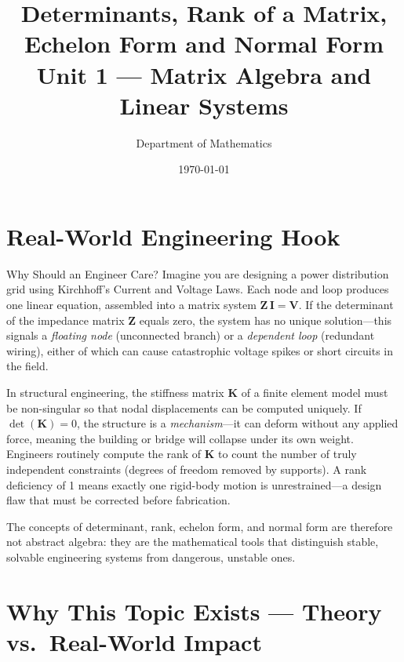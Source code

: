 \documentclass[12pt,a4paper]{article}
\title{\textbf{Determinants, Rank of a Matrix, Echelon Form and Normal Form} \\ \large Unit 1 --- Matrix Algebra and Linear Systems}
\author{Department of Mathematics}
\date{\today}
\begin{document}
\maketitle
\tableofcontents
\newpage

\section{Real-World Engineering Hook}

\begin{curiositybox}{Why Should an Engineer Care?}
Imagine you are designing a power distribution grid using Kirchhoff's Current and Voltage Laws.
Each node and loop produces one linear equation, assembled into a matrix system $\mathbf{Z}\,\mathbf{I} = \mathbf{V}$.
If the determinant of the impedance matrix $\mathbf{Z}$ equals zero, the system has no unique solution---this signals
a \emph{floating node} (unconnected branch) or a \emph{dependent loop} (redundant wiring), either of which
can cause catastrophic voltage spikes or short circuits in the field.

In structural engineering, the stiffness matrix $\mathbf{K}$ of a finite element model must be non-singular
so that nodal displacements can be computed uniquely. If $\det(\mathbf{K}) = 0$, the structure is a
\emph{mechanism}---it can deform without any applied force, meaning the building or bridge will collapse
under its own weight. Engineers routinely compute the rank of $\mathbf{K}$ to count the number of truly
independent constraints (degrees of freedom removed by supports). A rank deficiency of 1 means exactly
one rigid-body motion is unrestrained---a design flaw that must be corrected before fabrication.

The concepts of determinant, rank, echelon form, and normal form are therefore not abstract algebra:
they are the mathematical tools that distinguish stable, solvable engineering systems from dangerous, unstable ones.
\end{curiositybox}

\section{Why This Topic Exists --- Theory vs.\ Real-World Impact}
\end{document}
